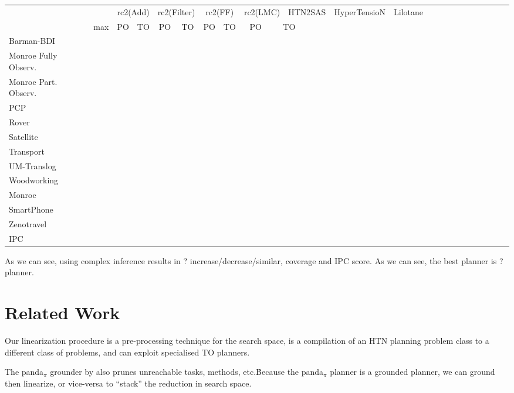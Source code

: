 \documentclass[letterpaper]{article}
\begin{document}
\begin{table}[h]
	\scalebox{0.45} {
		\begin{tabular}{lccccccccccccccccccccccccl} 
			\toprule 
			&& \multicolumn{2}{c}{rc2(Add)} & \multicolumn{2}{c}{rc2(Filter)} & \multicolumn{2}{c}{rc2(FF)} & \multicolumn{2}{c}{rc2(LMC)}  & \multicolumn{2}{c}{HTN2SAS} & \multicolumn{2}{c}{HyperTensioN} & \multicolumn{2}{c}{Lilotane} \\ 
			\cmidrule(lr){3-4} \cmidrule(lr){5-6} \cmidrule(lr){7-8} \cmidrule(lr){9-10} \cmidrule(lr){11-12}  \cmidrule(lr){13-14} \cmidrule(lr){15-16}    
			& max &PO & TO & PO & TO & PO & TO & PO &\multicolumn{2}{c}{ TO  }  \\ 
			\midrule 
			Barman-BDI  \\ 
			Monroe Fully Observ. \\ 
			Monroe Part. Observ. \\ 
			PCP\\ 
			Rover  \\ 
			Satellite  \\ 
			Transport \\ 
			UM-Translog \\ 
			Woodworking \\ 
			\midrule 
			Monroe  \\ 
			SmartPhone \\ 
			Zenotravel \\ 
			\midrule 
			IPC \\
			\bottomrule
		\end{tabular} 	
	}
\end{table}


As we can see, using complex inference results in ?  increase/decrease/similar, coverage and IPC score.
As we can see, the best planner is ? planner.

\section{Related Work}
Our linearization procedure is a pre-processing technique for the search space, is a compilation of an HTN planning problem class to a different class of problems, and can exploit specialised TO planners.
 
The panda$_\pi$ grounder by \cite{Behnke2020Grounding} also prunes unreachable tasks, methods, etc.\.  Because the panda$_{\pi}$ planner is a grounded planner, we can ground then linearize, or vice-versa to \enquote{stack} the reduction in search space.
\end{document}
